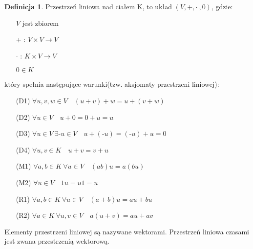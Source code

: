 \documentclass[12pt,a4paper]{article}
\theoremstyle{plain}
\theoremstyle{definition}
\theoremstyle{definition}
\newtheorem{df}{Definicja}[section]
\theoremstyle{definition}
\theoremstyle{definition}
\theoremstyle{definition}
\theoremstyle{definition}
\theoremstyle{definition}
\begin{document}
\begin{df}
Przestrzeń liniowa nad ciałem K, to układ $(V,+,\cdot\ ,0)$, gdzie:
\begin{itemize} 
        \item[] $V$ jest zbiorem
        \item[+]: $V \times V \rightarrow V$
        \item[$\cdot$]: $K \times V \rightarrow V$
        \item[] $0 \in K$ 
    \end{itemize} 
    który spełnia następujące warunki(tzw. aksjomaty przestrzeni liniowej): 
    \begin{itemize}
        \item[(D1)] $\forall u, v, w \in V \quad (u+v)+w = u + (v+w)$
        \item[(D2)] $\forall u \in V \quad u+0 = 0+u = u$
        \item[(D3)] $\forall u \in V \ \exists \text{-}u \in V \quad u + (\text{-}u) = (\text{-}u) + u = 0$
        \item[(D4)] $\forall u, v \in K \quad u+v = v+u$
        \item[(M1)] $\forall a, b \in K\  \forall u \in V \quad (ab)u = a(bu) $
        \item[(M2)] $\forall u \in V \quad 1u = u1 = u$
        \item[(R1)] $ \forall a,b \in K\ \forall u \in V \quad (a+b)u = au + bu $
        \item[(R2)] $ \forall a \in K\ \forall u,v \in V \quad a(u+v) = au + av $
    \end{itemize}
    \vspace{5mm}
    Elementy przestrzeni liniowej są nazywane wektorami. 
    Przestrzeń liniowa czasami jest zwana przestrzenią wektorową.
\end{df}
\end{document}
